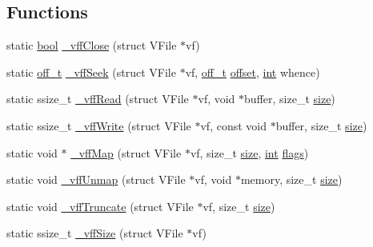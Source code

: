 \subsection*{Functions}
\begin{DoxyCompactItemize}
\item 
static \mbox{\hyperlink{libretro_8h_a4a26dcae73fb7e1528214a068aca317e}{bool}} \mbox{\hyperlink{vfs-file_8c_ac58e5fcc79e84a452cd675c7902aa225}{\+\_\+vff\+Close}} (struct V\+File $\ast$vf)
\item 
static \mbox{\hyperlink{__builder_8h_a53066be3c3a28d8b8ccb3dc95c1e49b1}{off\+\_\+t}} \mbox{\hyperlink{vfs-file_8c_a178c0916210d9b67414652d0df4b291a}{\+\_\+vff\+Seek}} (struct V\+File $\ast$vf, \mbox{\hyperlink{__builder_8h_a53066be3c3a28d8b8ccb3dc95c1e49b1}{off\+\_\+t}} \mbox{\hyperlink{ioapi_8h_a601c4660e8a1a14a1b87fe387e934d19}{offset}}, \mbox{\hyperlink{ioapi_8h_a787fa3cf048117ba7123753c1e74fcd6}{int}} whence)
\item 
static ssize\+\_\+t \mbox{\hyperlink{vfs-file_8c_a1d85f044bf97112d5d1ba2f57daba7d3}{\+\_\+vff\+Read}} (struct V\+File $\ast$vf, void $\ast$buffer, size\+\_\+t \mbox{\hyperlink{ioapi_8h_a014d89bd76f74ef3a29c8f04b473eb76}{size}})
\item 
static ssize\+\_\+t \mbox{\hyperlink{vfs-file_8c_addc171631afec453d709b1a6f2fff3cb}{\+\_\+vff\+Write}} (struct V\+File $\ast$vf, const void $\ast$buffer, size\+\_\+t \mbox{\hyperlink{ioapi_8h_a014d89bd76f74ef3a29c8f04b473eb76}{size}})
\item 
static void $\ast$ \mbox{\hyperlink{vfs-file_8c_ae264af80ce9f8d7e855924166bbe3866}{\+\_\+vff\+Map}} (struct V\+File $\ast$vf, size\+\_\+t \mbox{\hyperlink{ioapi_8h_a014d89bd76f74ef3a29c8f04b473eb76}{size}}, \mbox{\hyperlink{ioapi_8h_a787fa3cf048117ba7123753c1e74fcd6}{int}} \mbox{\hyperlink{lr35902_2decoder_8c_a11f29eea941556f0630cfd3285f565c0}{flags}})
\item 
static void \mbox{\hyperlink{vfs-file_8c_a359856c1b2b58f1cb08c962ff0bbd6f7}{\+\_\+vff\+Unmap}} (struct V\+File $\ast$vf, void $\ast$memory, size\+\_\+t \mbox{\hyperlink{ioapi_8h_a014d89bd76f74ef3a29c8f04b473eb76}{size}})
\item 
static void \mbox{\hyperlink{vfs-file_8c_a44e1cdacc71a8e16868d8c968e644ec6}{\+\_\+vff\+Truncate}} (struct V\+File $\ast$vf, size\+\_\+t \mbox{\hyperlink{ioapi_8h_a014d89bd76f74ef3a29c8f04b473eb76}{size}})
\item 
static ssize\+\_\+t \mbox{\hyperlink{vfs-file_8c_af0919c50f70e8df2e12ca7fb437a0b4b}{\+\_\+vff\+Size}} (struct V\+File $\ast$vf)

\end{DoxyCompactItemize}
